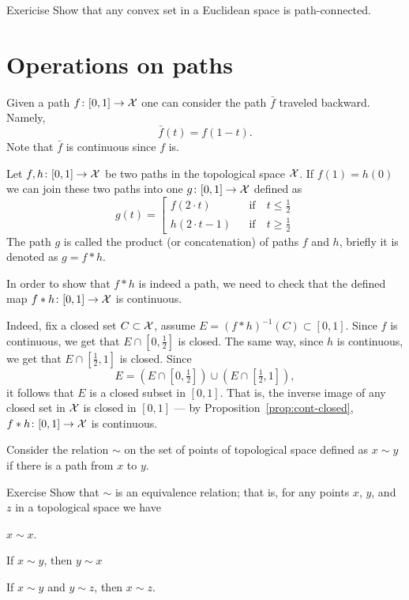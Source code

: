 \begin{thm}{Exericise}
Show that any convex set in a Euclidean space is path-connected. 
\end{thm}

\section{Operations on paths}

Given a path $f\colon[0,1]\to \mathcal{X}$ one can consider the path $\bar f$ traveled backward.
Namely, 
\[\bar f(t)=f(1-t).\]
Note that $\bar f$ is continuous since $f$ is.

Let $f,h\colon[0,1]\to \mathcal{X}$ be two paths in the topological space $\mathcal{X}$.
If $f(1)=h(0)$ we can join these two paths into one $g\colon[0,1]\to \mathcal{X}$ defined as 
\[g(t)=
\left[
\begin{aligned}
f(2\cdot t)&&\text{if}&\ t\le \tfrac12
\\
h(2\cdot t-1)&&\text{if}&\ t\ge \tfrac12
\end{aligned}
\right.
\]
The path $g$ is called the product (or concatenation) of paths $f$ and $h$, briefly it is denoted as $g=f * h$.

In order to show that $f * h$ is indeed a path, we need to check that the defined map $f * h\colon[0,1]\to \mathcal{X}$ is continuous.

Indeed, fix a closed set $C\subset \mathcal{X}$,
assume $E=(f * h)^{-1}(C)\subset [0,1]$.
Since $f$ is continuous, we get that $E\cap [0,\tfrac12]$ is closed.
The same way, since $h$ is continuous, we get that $E\cap [\tfrac12,1]$ is closed.
Since 
\[E=(E\cap [0,\tfrac12])\cup (E\cap [\tfrac12,1]),\] 
it follows that $E$ is a closed subset in $[0,1]$.
That is, the inverse image of any closed set in $\mathcal{X}$ is closed in $[0,1]$ --- by Proposition~\ref{prop:cont-closed}, $f * h\colon[0,1]\to \mathcal{X}$ is continuous.


Consider the relation $\sim$ on the set of points of topological space defined as $x\sim y$ if there is a path from $x$ to $y$.

\begin{thm}{Exercise}
Show that $\sim$ is an equivalence relation;
that is, for any points $x$, $y$, and $z$ in a topological space we have

\begin{subthm}{}
$x\sim x$.
\end{subthm}

\begin{subthm}{}
If $x\sim y$, then $y\sim x$
\end{subthm}

\begin{subthm}{}
If $x\sim y$ and $y\sim z$, then $x\sim z$.
\end{subthm}

\end{thm}

